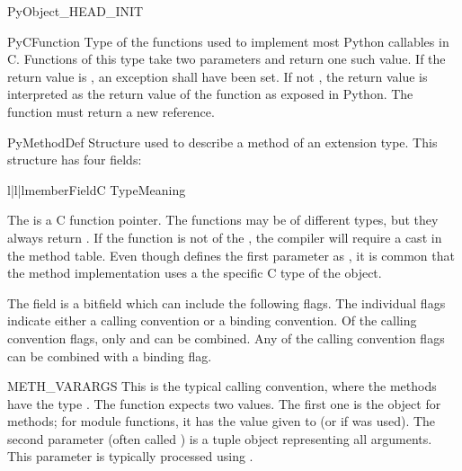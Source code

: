 PyObject_HEAD_INIT

\begin{ctypedesc}{PyCFunction}
  Type of the functions used to implement most Python callables in C.
  Functions of this type take two  parameters and
  return one such value.  If the return value is \NULL, an exception
  shall have been set.  If not \NULL, the return value is interpreted
  as the return value of the function as exposed in Python.  The
  function must return a new reference.
\end{ctypedesc}

\begin{ctypedesc}{PyMethodDef}
  Structure used to describe a method of an extension type.  This
  structure has four fields:

  \begin{tableiii}{l|l|l}{member}{Field}{C Type}{Meaning}
  \end{tableiii}
\end{ctypedesc}

The  is a C function pointer.  The functions may be of
different types, but they always return .  If the
function is not of the , the compiler will require
a cast in the method table.  Even though  defines
the first parameter as , it is common that the method
implementation uses a the specific C type of the  object.

The  field is a bitfield which can include the
following flags.  The individual flags indicate either a calling
convention or a binding convention.  Of the calling convention flags,
only  and  can be
combined.  Any of the calling convention flags can be combined with a
binding flag.

\begin{datadesc}{METH_VARARGS}
  This is the typical calling convention, where the methods have the
  type . The function expects two
   values.  The first one is the  object for
  methods; for module functions, it has the value given to
   (or \NULL{} if
   was used).  The second parameter
  (often called ) is a tuple object representing all
  arguments. This parameter is typically processed using
  .
\end{datadesc}

